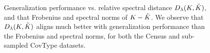 \begin{figure}
	\caption{Generalization performance vs. relative spectral distance $D_{\lambda}(K,\tilde{K})$, and that Frobenius and spectral norms of $K - \tilde{K}$. We observe that $D_{\lambda}(K,\tilde{K})$ aligns much better with generalization performance than the Frobenius and spectral norms, for both the Census and sub-sampled CovType datasets.}
	\label{fig:specdist_app}	
\end{figure}



